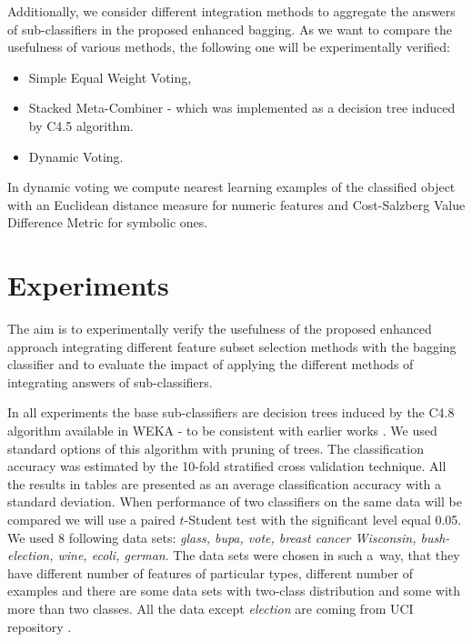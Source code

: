 \documentclass[runningheads]{llncs}
\begin{document}
Additionally, we consider different integration methods to aggregate the
answers of sub-classifiers in the proposed enhanced bagging. As we want to
compare the usefulness of various methods, the following one will be
experimentally verified:
\begin{itemize}
  \item Simple Equal Weight Voting,
  \item Stacked Meta-Combiner - which was implemented as a decision tree
  induced by C4.5 algorithm.
  \item Dynamic Voting.
\end{itemize}


In dynamic voting we compute nearest learning examples of the classified
object with an Euclidean distance measure for numeric features and
Cost-Salzberg Value Difference Metric for symbolic ones.


\section{Experiments}

The aim is to  experimentally verify the usefulness of the proposed enhanced
approach integrating different feature subset selection methods with the
bagging classifier and to evaluate the impact of applying the different
methods of integrating answers of sub-classifiers.

In all experiments the base sub-classifiers are decision trees induced by
the  C4.8 algorithm available in WEKA \cite{weka} - to be consistent with
earlier works \cite{lat1,StefKacz04}. We used standard options of this
algorithm with pruning of trees. The classification accuracy was estimated
by the 10-fold stratified cross validation technique. All the results in
tables are presented as an average classification accuracy with a standard
deviation. When performance of two classifiers on the same data will be
compared we will use a paired $t$-Student test with the significant level
equal 0.05. We used 8 following data sets: {\em glass, bupa, vote, breast
cancer Wisconsin, bush-election, wine, ecoli, german}.
 The data sets were chosen in such a~way, that they have different number of features
of particular types, different number of examples and there are some data
sets with two-class distribution and some with more than two classes. All
the data except \emph{election} are coming from UCI repository
\cite{Irvine}.
\end{document}
